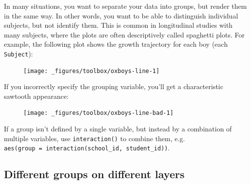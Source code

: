 In many situations, you want to separate your data into groups, but
render them in the same way. In other words, you want to be able to
distinguish individual subjects, but not identify them. This is common
in longitudinal studies with many subjects, where the plots are often
descriptively called spaghetti plots. For example, the following plot
shows the growth trajectory for each boy (each \texttt{Subject}):
 

\begin{Shaded}
\begin{Highlighting}[]
 \StringTok{ }
\StringTok{  }\NormalTok{() +}\StringTok{ }
\StringTok{  }\NormalTok{()}
\end{Highlighting}
\end{Shaded}

\begin{figure}[H]
  \centering
  \texttt{[image: \_figures/toolbox/oxboys-line-1]}
\end{figure}

If you incorrectly specify the grouping variable, you'll get a
characteristic sawtooth appearance:

\begin{Shaded}
\begin{Highlighting}[]
\StringTok{ }
\StringTok{  }\NormalTok{() +}\StringTok{ }
\StringTok{  }\NormalTok{()}
\end{Highlighting}
\end{Shaded}

\begin{figure}[H]
  \centering
  \texttt{[image: \_figures/toolbox/oxboys-line-bad-1]}
\end{figure}

If a group isn't defined by a single variable, but instead by a
combination of multiple variables, use \texttt{interaction()} to combine
them, e.g.
\texttt{aes(group\ =\ interaction(school\_id,\ student\_id))}.

\subsection{Different groups on different
layers}\label{different-groups-on-different-layers}

